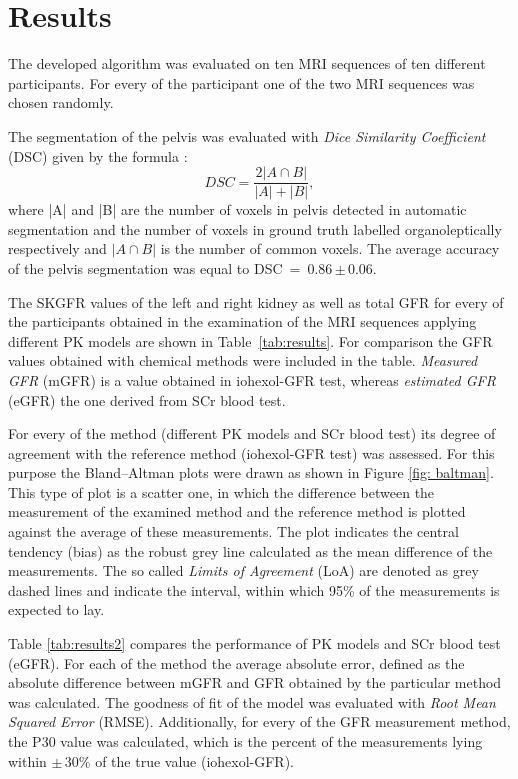 \section{Results}
The developed algorithm was evaluated on ten MRI sequences of ten different participants. For every of the participant one of the two  MRI sequences was chosen randomly.

The segmentation of the pelvis was evaluated with \textit{Dice Similarity Coefficient} (DSC) given by the formula \cite{dice1945measures}:
\begin{equation}
	\label{eq:dice}
	DSC = \dfrac{2|A\cap{}B|}{|A|+|B|},
\end{equation}
where |A| and |B| are the number of voxels in pelvis detected  in automatic segmentation and the number of voxels in ground truth labelled organoleptically respectively and $|A\cap{}B|$ is the number of common voxels.
The average accuracy of the pelvis segmentation was equal to DSC~=~0.86\,$\pm$\,0.06.

The SKGFR values of the left and right kidney as well as total GFR for every of the participants obtained in the examination of the MRI sequences applying different PK models are shown in Table~\ref{tab:results}. For comparison the GFR values obtained with chemical methods were included in the table. \textit{Measured GFR} (mGFR) is a value obtained in iohexol-GFR test, whereas \textit{estimated GFR} (eGFR) the one derived from SCr blood test.

For every of the method (different PK models and SCr blood test) its degree of agreement with the reference method  (iohexol-GFR test) was assessed. For this purpose the Bland–Altman plots were drawn \cite{bland1986statistical} as shown in Figure \ref{fig: baltman}. 
This type of plot is a scatter one, in which the difference between the measurement of the examined method and the reference method is plotted against the average of these measurements.
The plot indicates the central tendency (bias) as the robust grey line calculated as the mean difference of the measurements. The so called \textit{Limits of Agreement} (LoA) are denoted as grey dashed lines and indicate the interval, within which 95\% of the measurements is expected to lay.

Table \ref{tab:results2} compares the performance of PK models and SCr blood test (eGFR). For each of the method the average absolute error, defined as the absolute difference between mGFR and GFR obtained by the particular method was calculated.
The goodness of fit of the model was evaluated with \textit{Root Mean Squared Error} (RMSE). 
Additionally, for every of the GFR measurement method, the P30 value was calculated, which is the percent of the measurements lying within $\pm\,30\%$ of the true value (iohexol-GFR).




